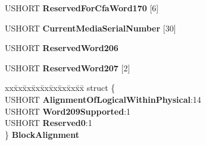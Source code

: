 \begin{DoxyCompactItemize}
\begin{tabbing}
\end{tabbing}\item 
\mbox{\label{struct___i_d_e_n_t_i_f_y___d_e_v_i_c_e___d_a_t_a_a85fb25885b8b424a616fd262f9dbaa5a}} 
U\+S\+H\+O\+RT {\bfseries Reserved\+For\+Cfa\+Word170} \mbox{[}6\mbox{]}
\item 
\mbox{\label{struct___i_d_e_n_t_i_f_y___d_e_v_i_c_e___d_a_t_a_ab28a740bbfce9cc363eb7b8e2778ac78}} 
U\+S\+H\+O\+RT {\bfseries Current\+Media\+Serial\+Number} \mbox{[}30\mbox{]}
\item 
\mbox{\label{struct___i_d_e_n_t_i_f_y___d_e_v_i_c_e___d_a_t_a_a0df9565eaf86d1bdbabc8a8670912e53}} 
U\+S\+H\+O\+RT {\bfseries Reserved\+Word206}
\item 
\mbox{\label{struct___i_d_e_n_t_i_f_y___d_e_v_i_c_e___d_a_t_a_a269bb5228cef391b5461cb123607ada8}} 
U\+S\+H\+O\+RT {\bfseries Reserved\+Word207} \mbox{[}2\mbox{]}
\item 
\mbox{\label{struct___i_d_e_n_t_i_f_y___d_e_v_i_c_e___d_a_t_a_a69d7f0c29f991a2ade5f9facf690f202}} 
\begin{tabbing}
xx\=xx\=xx\=xx\=xx\=xx\=xx\=xx\=xx\=\kill
struct \{\\
\>USHORT {\bfseries AlignmentOfLogicalWithinPhysical}:14\\
\>USHORT {\bfseries Word209Supported}:1\\
\>USHORT {\bfseries Reserved0}:1\\
\} {\bfseries BlockAlignment}\\


\end{tabbing}
\end{DoxyCompactItemize}
